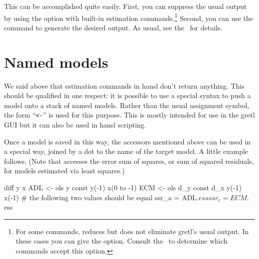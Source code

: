 This can be accomplished quite easily. First, you can suppress the
usual output by using the  option with built-in
estimation commands.\footnote{For some commands, 
  reduces but does not eliminate gretl's usual output. In these cases
  you can give the  option. Consult the \GCR\ to
  determine which commands accept this option.} Second, you can
use the  command to generate the desired output.
As usual, see the \GCR\ for details.

\section{Named models}

We said above that estimation commands in hansl don't return
anything. This should be qualified in one respect: it is possible to
use a special syntax to push a model onto a stack of named models.
Rather than the usual assignment symbol, the form ``\verb|<-|'' is
used for this purpose. This is mostly intended for use in the gretl
GUI but it can also be used in hansl scripting.

Once a model is saved in this way, the accessors mentioned above can
be used in a special way, joined by a dot to the name of the target
model. A little example follows. (Note that  accesses the
error sum of squares, or sum of squared residuals, for models
estimated via least squares.)

\begin{code}
diff y x
ADL <- ols y const y(-1) x(0 to -1)
ECM <- ols d_y const d_x y(-1) x(-1)
# the following two values should be equal
ssr_a = ADL.$ess
ssr_e = ECM.$ess
\end{code}

\label{LastPage}

